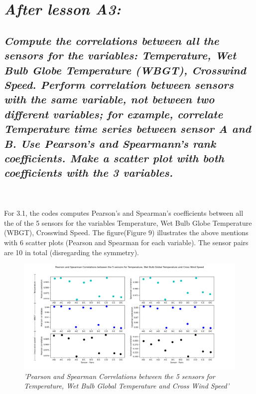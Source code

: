 \documentclass[a4paper,12pt]{article} %
\begin{document}
\section{\it After lesson A3:}
\subsection{\it Compute the correlations between all the sensors for the variables: Temperature, Wet Bulb Globe Temperature (WBGT), Crosswind Speed. Perform correlation between sensors with the same variable, not between two different variables; for example, correlate Temperature time series between sensor A and B. Use Pearson’s and Spearmann’s rank coefficients. Make a scatter plot with both coefficients with the 3 variables.}
\\\\
For 3.1, the codes computes Pearson’s and Spearman’s 
coefficients between all the of the 5 sensors for the variables Temperature, 
Wet Bulb Globe Temperature (WBGT), Crosswind Speed. The figure(Figure 9) illustrates the above mentions with 6 scatter plots 
(Pearson and Spearman for each variable). The sensor pairs are 10 in total (disregarding the symmetry).
\\
\begin{figure}[H]
\centering
\includegraphics[width=\textwidth]{Graphs/Pearson-Spearman_5_sensors_Temp,_WBGT,CrWinSpeed.png}
\caption{\it'Pearson and Spearman Correlations between the 5 sensors for Temperature, Wet Bulb Global Temperature and Cross Wind Speed'}
\end{figure}
\\\\
\end{document}
